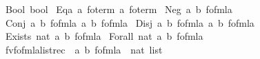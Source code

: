 \begin{isabellebody}
{\isacharbar}{\kern0pt}\ Bool\ bool\isanewline
{\isacharbar}{\kern0pt}\ Eqa\ {\isachardoublequoteopen}{\isacharprime}{\kern0pt}a\ fo{\isacharunderscore}{\kern0pt}term{\isachardoublequoteclose}\ {\isachardoublequoteopen}{\isacharprime}{\kern0pt}a\ fo{\isacharunderscore}{\kern0pt}term{\isachardoublequoteclose}\isanewline
{\isacharbar}{\kern0pt}\ Neg\ {\isachardoublequoteopen}{\isacharparenleft}{\kern0pt}{\isacharprime}{\kern0pt}a{\isacharcomma}{\kern0pt}\ {\isacharprime}{\kern0pt}b{\isacharparenright}{\kern0pt}\ fo{\isacharunderscore}{\kern0pt}fmla{\isachardoublequoteclose}\isanewline
{\isacharbar}{\kern0pt}\ Conj\ {\isachardoublequoteopen}{\isacharparenleft}{\kern0pt}{\isacharprime}{\kern0pt}a{\isacharcomma}{\kern0pt}\ {\isacharprime}{\kern0pt}b{\isacharparenright}{\kern0pt}\ fo{\isacharunderscore}{\kern0pt}fmla{\isachardoublequoteclose}\ {\isachardoublequoteopen}{\isacharparenleft}{\kern0pt}{\isacharprime}{\kern0pt}a{\isacharcomma}{\kern0pt}\ {\isacharprime}{\kern0pt}b{\isacharparenright}{\kern0pt}\ fo{\isacharunderscore}{\kern0pt}fmla{\isachardoublequoteclose}\isanewline
{\isacharbar}{\kern0pt}\ Disj\ {\isachardoublequoteopen}{\isacharparenleft}{\kern0pt}{\isacharprime}{\kern0pt}a{\isacharcomma}{\kern0pt}\ {\isacharprime}{\kern0pt}b{\isacharparenright}{\kern0pt}\ fo{\isacharunderscore}{\kern0pt}fmla{\isachardoublequoteclose}\ {\isachardoublequoteopen}{\isacharparenleft}{\kern0pt}{\isacharprime}{\kern0pt}a{\isacharcomma}{\kern0pt}\ {\isacharprime}{\kern0pt}b{\isacharparenright}{\kern0pt}\ fo{\isacharunderscore}{\kern0pt}fmla{\isachardoublequoteclose}\isanewline
{\isacharbar}{\kern0pt}\ Exists\ nat\ {\isachardoublequoteopen}{\isacharparenleft}{\kern0pt}{\isacharprime}{\kern0pt}a{\isacharcomma}{\kern0pt}\ {\isacharprime}{\kern0pt}b{\isacharparenright}{\kern0pt}\ fo{\isacharunderscore}{\kern0pt}fmla{\isachardoublequoteclose}\isanewline
{\isacharbar}{\kern0pt}\ Forall\ nat\ {\isachardoublequoteopen}{\isacharparenleft}{\kern0pt}{\isacharprime}{\kern0pt}a{\isacharcomma}{\kern0pt}\ {\isacharprime}{\kern0pt}b{\isacharparenright}{\kern0pt}\ fo{\isacharunderscore}{\kern0pt}fmla{\isachardoublequoteclose}\isanewline
\isanewline
{}\isamarkupfalse%
\ fv{\isacharunderscore}{\kern0pt}fo{\isacharunderscore}{\kern0pt}fmla{\isacharunderscore}{\kern0pt}list{\isacharunderscore}{\kern0pt}rec\ {\isacharcolon}{\kern0pt}{\isacharcolon}{\kern0pt}\ {\isachardoublequoteopen}{\isacharparenleft}{\kern0pt}{\isacharprime}{\kern0pt}a{\isacharcomma}{\kern0pt}\ {\isacharprime}{\kern0pt}b{\isacharparenright}{\kern0pt}\ fo{\isacharunderscore}{\kern0pt}fmla\ {\isasymRightarrow}\ nat\ list{\isachardoublequoteclose}\ \isanewline

\end{isabellebody}
